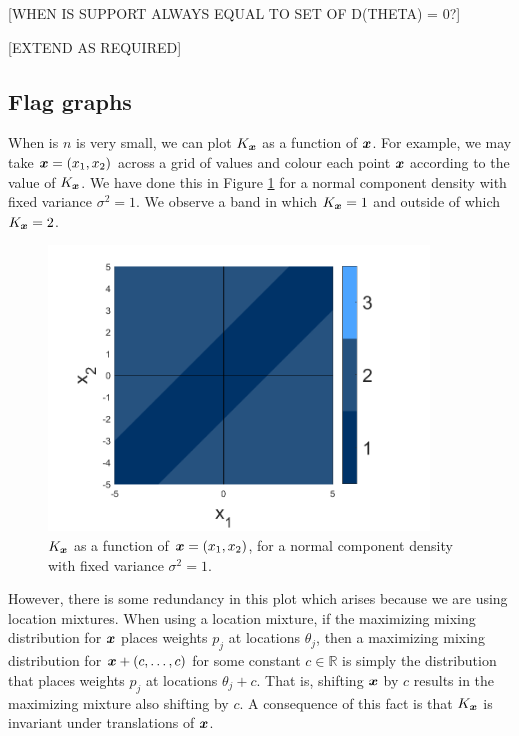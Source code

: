 	[WHEN IS SUPPORT ALWAYS EQUAL TO SET OF D(THETA) = 0?]

	[EXTEND AS REQUIRED]

	\subsection{Flag graphs}
	\label{sec: flag graphs}
	When is $n$ is very small, we can plot $K_{\bm{{x}}}$ as a function of ${\bm{{x}}}$. For example, we may take ${\bm{{x}}} = (x_1, x_2)$ across a grid of values and colour each point ${\bm{{x}}}$ according to the value of $K_{\bm{{x}}}$. We have done this in Figure \ref{fig:normal_flag_graph_n2} for a normal component density with fixed variance $\sigma^2 = 1$. We observe a band in which $K_{\bm{{x}}} = 1$ and outside of which $K_{\bm{{x}}} = 2$.

	\begin{figure}
		\centering
		\includegraphics[width = 0.9\textwidth]{Figures/Mixtures/normal_flag_graph_n2.png}
		\caption{$K_{\bm{{x}}}$ as a function of ${\bm{{x}}} = (x_1, x_2)$, for a normal component density with fixed variance $\sigma^2 = 1$.}
		\label{fig:normal_flag_graph_n2}
	\end{figure}

	However, there is some redundancy in this plot which arises because we are using location mixtures. When using a location mixture, if the maximizing mixing distribution for ${\bm{{x}}}$ places weights $p_j$ at locations $\theta_j$, then a maximizing mixing distribution for ${\bm{{x}}} + (c, \dots, c)$ for some constant $c \in \mathbb{R}$ is simply the distribution that places weights $p_j$ at locations $\theta_j + c$. That is, shifting ${\bm{{x}}}$ by $c$ results in the maximizing mixture also shifting by $c$. A consequence of this fact is that $K_{\bm{{x}}}$ is invariant under translations of ${\bm{{x}}}$.

